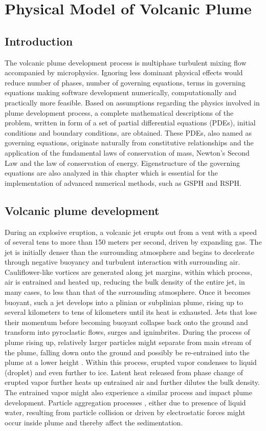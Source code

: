 \chapter{Physical Model of Volcanic Plume} \label{chapter:physics-model}
\section{Introduction}
The volcanic plume development process is multiphase turbulent mixing flow accompanied by microphysics. Ignoring less dominant physical effects would reduce number of phases, number of governing equations, terms in governing equations making software development numerically, computationally and practically more feasible. Based on assumptions regarding the physics involved in plume development process, a complete mathematical descriptions of the problem, written in form of a set of partial differential equations (PDEs), initial conditions and boundary conditions, are obtained. These PDEs, also named as governing equations, originate naturally
from constitutive relationships and the application of the fundamental laws of conservation of mass, Newton’s Second Law and the law of conservation of energy. Eigenstructure of the governing equations are also analyzed in this chapter which is essential for the implementation of advanced numerical methods, such as GSPH and RSPH.

\section{Volcanic plume development}
During an explosive eruption, a volcanic jet erupts out from a vent with a speed of several tens to more than 150 meters per second, driven by expanding gas. The jet is initially denser than the surrounding atmosphere and begins to decelerate through negative buoyancy and turbulent interaction with surrounding air. Cauliflower-like vortices are generated along jet margins, within which process, air is entrained and heated up, reducing the bulk density of the entire jet, in many cases, to less than that of the surrounding atmosphere. Once it becomes buoyant, such a jet develops into a plinian or subplinian plume, rising up to several kilometers to tens of kilometers until its heat is exhausted. Jets that lose their momentum before becoming buoyant collapse back onto the ground and transform into pyroclastic flows, surges and ignimbrites. During the process of plume rising up, relatively larger particles might separate from main stream of the plume, falling down onto the ground and possibly be re-entrained into the plume at a lower height \citep{ernst1996sedimentation}. Within this process, erupted vapor condenses to liquid (droplet) and even further to ice. Latent heat released from phase change of erupted vapor  further heats up entrained air and further dilutes the bulk density. The entrained vapor might also experience a similar process and impact plume development. Particle aggregation processes \citep{carey1982influence,taddeucci2011aggregation}, either due to presence of liquid water, resulting from particle collision or driven by electrostatic forces might occur inside plume and thereby affect the sedimentation. 

